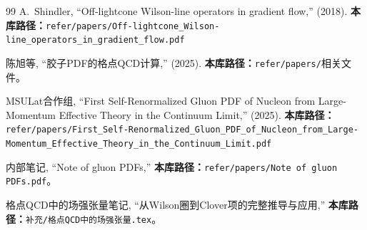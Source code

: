 \documentclass[12pt,a4paper]{ctexart}
\theoremstyle{definition}
\begin{document}
\begin{thebibliography}{99}
A.~Shindler,
``Off-lightcone Wilson-line operators in gradient flow,''
(2018).
\textbf{本库路径：}\texttt{refer/papers/Off-lightcone\_Wilson-line\_operators\_in\_gradient\_flow.pdf}

陈旭等,
``胶子PDF的格点QCD计算,''
(2025).
\textbf{本库路径：}\texttt{refer/papers/}相关文件。

MSULat合作组,
``First Self-Renormalized Gluon PDF of Nucleon from Large-Momentum Effective Theory in the Continuum Limit,''
(2025).
\textbf{本库路径：}\texttt{refer/papers/First\_Self-Renormalized\_Gluon\_PDF\_of\_Nucleon\_from\_Large-Momentum\_Effective\_Theory\_in\_the\_Continuum\_Limit.pdf}

内部笔记,
``Note of gluon PDFs,''
\textbf{本库路径：}\texttt{refer/papers/Note of gluon PDFs.pdf}。

格点QCD中的场强张量笔记,
``从Wilson圈到Clover项的完整推导与应用,''
\textbf{本库路径：}\texttt{补充/格点QCD中的场强张量.tex}。

\end{thebibliography}
\end{document}
